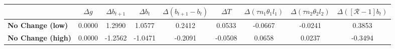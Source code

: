 \begin{tiny}\begin{tabular}{|l|c|c|c|c|c|c|c|c|}
\hline
&\textbf{$\Delta g$}&\textbf{$\Delta b_{t+1}$}&\textbf{$\Delta b_{t}$}&\textbf{$\Delta (b_{t+1}-b_t)$}&\textbf{$\Delta T$}&\textbf{$\Delta (\tau n_1\theta_1 l_1 )$}&\textbf{$\Delta (\tau n_2\theta_2 l_2)$}&\textbf{$\Delta ([\mathcal{R}-1]b_t)$}\\\hline
\textbf{No Change (low)}&0.0000&1.2990&1.0577&0.2412&0.0533&-0.0667&-0.0241&0.3853\\\hline
\textbf{No Change (high)}&0.0000&-1.2562&-1.0471&-0.2091&-0.0508&0.0658&0.0237&-0.3494\\\hline
\end{tabular}
\end{tiny}